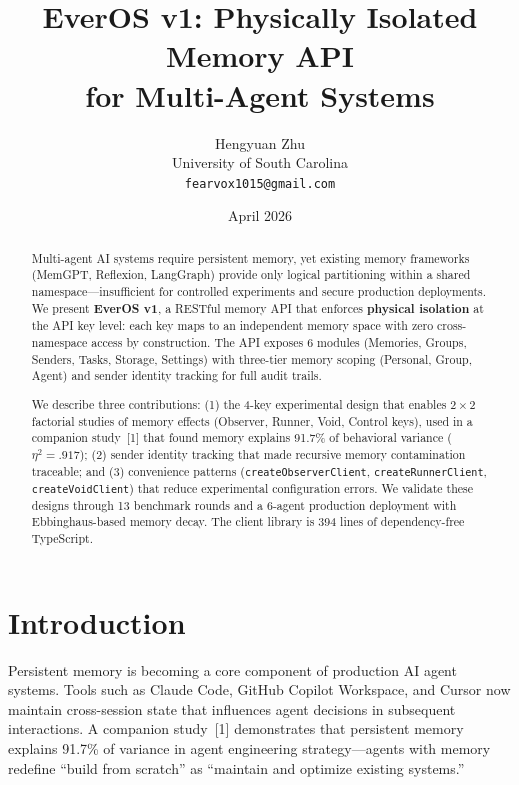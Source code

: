 \documentclass[11pt, a4paper]{article}
\title{%
  \sffamily\bfseries
  EverOS v1: Physically Isolated Memory API\\
  for Multi-Agent Systems%
}
\author{%
  Hengyuan Zhu\\
  {\small University of South Carolina}\\
  {\small\texttt{fearvox1015@gmail.com}}
}
\date{April 2026}
\begin{document}
\maketitle

\begin{abstract}
Multi-agent AI systems require persistent memory, yet existing memory frameworks (MemGPT, Reflexion, LangGraph) provide only logical partitioning within a shared namespace---insufficient for controlled experiments and secure production deployments. We present \textbf{EverOS v1}, a RESTful memory API that enforces \textbf{physical isolation} at the API key level: each key maps to an independent memory space with zero cross-namespace access by construction. The API exposes 6 modules (Memories, Groups, Senders, Tasks, Storage, Settings) with three-tier memory scoping (Personal, Group, Agent) and sender identity tracking for full audit trails.

We describe three contributions: (1) the 4-key experimental design that enables $2 \times 2$ factorial studies of memory effects (Observer, Runner, Void, Control keys), used in a companion study~[1] that found memory explains 91.7\% of behavioral variance ($\eta^2 = .917$); (2) sender identity tracking that made recursive memory contamination traceable; and (3) convenience patterns (\texttt{createObserverClient}, \texttt{createRunnerClient}, \texttt{createVoidClient}) that reduce experimental configuration errors. We validate these designs through 13 benchmark rounds and a 6-agent production deployment with Ebbinghaus-based memory decay. The client library is 394 lines of dependency-free TypeScript.
\end{abstract}

\section{Introduction}

Persistent memory is becoming a core component of production AI agent systems. Tools such as Claude Code, GitHub Copilot Workspace, and Cursor now maintain cross-session state that influences agent decisions in subsequent interactions. A companion study~[1] demonstrates that persistent memory explains 91.7\% of variance in agent engineering strategy---agents with memory redefine ``build from scratch'' as ``maintain and optimize existing systems.''
\end{document}
